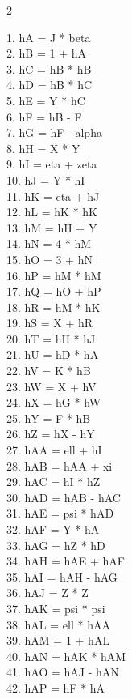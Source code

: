 \documentclass[10pt]{article}
\begin{document}
\begin{multicols}{2}
\raggedright\ttfamily\fontsize{8}{9.2}\selectfont
1. hA = J * beta\\
2. hB = 1 + hA\\
3. hC = hB * hB\\
4. hD = hB * hC\\
5. hE = Y * hC\\
6. hF = hB - F\\
7. hG = hF - alpha\\
8. hH = X * Y\\
9. hI = eta + zeta\\
10. hJ = Y * hI\\
11. hK = eta + hJ\\
12. hL = hK * hK\\
13. hM = hH + Y\\
14. hN = 4 * hM\\
15. hO = 3 + hN\\
16. hP = hM * hM\\
17. hQ = hO + hP\\
18. hR = hM * hK\\
19. hS = X + hR\\
20. hT = hH * hJ\\
21. hU = hD * hA\\
22. hV = K * hB\\
23. hW = X + hV\\
24. hX = hG * hW\\
25. hY = F * hB\\
26. hZ = hX - hY\\
27. hAA = ell + hI\\
28. hAB = hAA + xi\\
29. hAC = hI * hZ\\
30. hAD = hAB - hAC\\
31. hAE = psi * hAD\\
32. hAF = Y * hA\\
33. hAG = hZ * hD\\
34. hAH = hAE + hAF\\
35. hAI = hAH - hAG\\
36. hAJ = Z * Z\\
37. hAK = psi * psi\\
38. hAL = ell * hAA\\
39. hAM = 1 + hAL\\
40. hAN = hAK * hAM\\
41. hAO = hAJ - hAN\\
42. hAP = hF * hA\\

\end{multicols}
\end{document}
